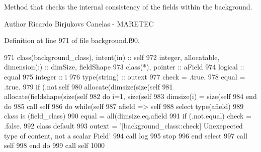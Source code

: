 Method that checks the internal consistency of the fields within the background. 

\begin{DoxyAuthor}{Author}
Ricardo Birjukovs Canelas -\/ M\+A\+R\+E\+T\+EC 
\end{DoxyAuthor}


Definition at line 971 of file background.\+f90.


\begin{DoxyCode}
971     \textcolor{keywordtype}{class}(background\_class), \textcolor{keywordtype}{intent(in)} :: self
972     \textcolor{keywordtype}{integer}, \textcolor{keywordtype}{allocatable}, \textcolor{keywordtype}{dimension(:)} :: dimSize, fieldShape
973     \textcolor{keywordtype}{class}(*), \textcolor{keywordtype}{pointer} :: aField
974     \textcolor{keywordtype}{logical} :: equal
975     \textcolor{keywordtype}{integer} :: i
976     \textcolor{keywordtype}{type}(string) :: outext
977     check = .true.
978     equal = .true.
979     \textcolor{keywordflow}{if} (.not.self%
980     \textcolor{keyword}{allocate}(dimsize(\textcolor{keyword}{size}(self%
981     \textcolor{keyword}{allocate}(fieldshape(\textcolor{keyword}{size}(self%
982     \textcolor{keywordflow}{do} i=1, \textcolor{keyword}{size}(self%
983         dimsize(i) = \textcolor{keyword}{size}(self%
984 \textcolor{keywordflow}{    end do}
985     \textcolor{keyword}{call }self%
986     \textcolor{keywordflow}{do} \textcolor{keywordflow}{while}(self%
987         afield => self%
988         \textcolor{keywordflow}{select type}(afield)
989 \textcolor{keywordflow}{        class is} (field\_class)
990             equal = all(dimsize.eq.afield%
991             \textcolor{keywordflow}{if} (.not.equal) check = .false.
992 \textcolor{keywordflow}{            class default}
993             outext = \textcolor{stringliteral}{'[background\_class::check] Unexepected type of content, not a scalar Field'}
994             \textcolor{keyword}{call }log%
995             stop
996 \textcolor{keywordflow}{        end select}
997         \textcolor{keyword}{call }self%
998 \textcolor{keywordflow}{    end do}
999     \textcolor{keyword}{call }self%
1000 
\end{DoxyCode}
\mbox{\label{namespacebackground__mod_a1610fcc9ce260beb3c35418e92a63391}} 
